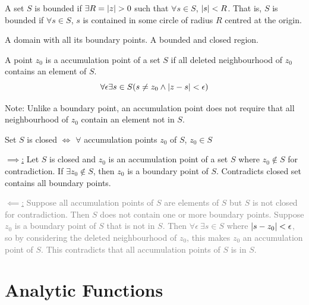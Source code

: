 \documentclass[12pt, english]{book}
\makeatletter
\renewenvironment{proof}[1][\proofname]{\par
	\pushQED{\qed}%
	\normalfont \topsep6\p@\@plus6\p@\relax
	\list{}{%
		\settowidth{\leftmargin}{\itshape\proofname:\hskip\labelsep}%
		\setlength{\labelwidth}{0pt}%
		\setlength{\itemindent}{-\leftmargin}%
	}%
	\item[\hskip\labelsep\itshape#1\@addpunct{:}]\ignorespaces
	}{ \popQED\endlist\@endpefalse}
\makeatother
\begin{document}
	\begin{definition}
		\label{Bounded Set or Region Definition - Complex}
		A set $S$ is bounded if $\exists R = \abs{z} > 0$ such that $\forall s \in S$, $\abs{s} < R$. That is, $S$ is bounded if $\forall s \in S$, $s$ is contained in some circle of radius $R$ centred at the origin. 
	\end{definition}

	\begin{definition}
		\label{Closed Regoin Definition - Complex}
		A domain with all its boundary points. A bounded and closed region.
	\end{definition}

	\begin{definition}
		 
		\label{Accumulation/Limit Point Definition - Complex}
		A point $z_0$ is a accumulation point of a set $S$ if all deleted neighbourhood of $z_0$ contains an element of $S$. 
		$$\forall \epsilon \exists s \in S (s \neq z_0 \land \abs{z-s} < \epsilon)$$
	\end{definition}
	Note: Unlike a boundary point, an accumulation point does not require that all neighbourhood of $z_0$ contain an element not in $S$.
	
	\begin{theorem}
		Set $S$ is closed $\iff$ $\forall$ accumulation points $z_0$ of $S$, $z_0 \in S$
	\end{theorem}
	\begin{proof}
		\underline{$\implies$:}
		Let $S$ is closed and $z_0$ is an accumulation point of a set $S$ where $z_0 \notin S$ for contradiction. If $\exists z_0 \notin S$, then $z_0$ is a boundary point of $S$. Contradicts closed set contains all boundary points. 
		
		\textcolor{Grey}{
		\underline{$\impliedby$:}
		Suppose all accumulation points of $S$ are elements of $S$ but $S$ is not closed for contradiction. Then $S$ does not contain one or more boundary points. Suppose $z_0$ is a boundary point of $S$ that is not in $S$. Then $\forall \epsilon \ \exists s\in S$ where $\abs{s-z_0} < \epsilon$, so by considering the deleted neighbourhood of $z_0$, this makes $z_0$ an accumulation point of $S$. This contradicts that all accumulation points of $S$ is in $S$. 		
		}
	\end{proof}

	\chapter{Analytic Functions} \label{Analytic Functions Chapter - Complex}
\end{document}
